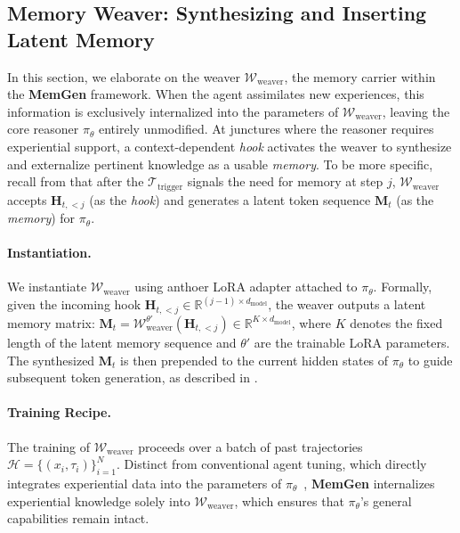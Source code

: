 \documentclass[]{fairmeta}
\newcommand{\ourmethod}{{\fontfamily{lmtt}\selectfont \textbf{MemGen}}\xspace}
\begin{document}
\subsection{Memory Weaver: Synthesizing and Inserting Latent Memory}
\label{sec:weaver}
\vspace{-0.3em}
In this section, we elaborate on the weaver $\mathcal{W}_\text{weaver}$, the memory carrier within the \ourmethod framework. When the agent assimilates new experiences, this information is exclusively internalized into the parameters of $\mathcal{W}_\text{weaver}$, leaving the core reasoner $\pi_\theta$ entirely unmodified. At junctures where the reasoner requires experiential support, a context-dependent \textit{hook} activates the weaver to synthesize and externalize pertinent knowledge as a usable \textit{memory}. To be more specific, recall from  that after the $\mathcal{T}_\text{trigger}$ signals the need for memory at step $j$, $\mathcal{W}_\text{weaver}$ accepts $\mathbf{H}_{t,<j}$ (as the \textit{hook}) and generates a latent token sequence $\mathbf{M}_t$ (as the \textit{memory}) for $\pi_\theta$.

\vspace{-0.8em}
\paragraph{Instantiation.} We instantiate $\mathcal{W}_\text{weaver}$ using anthoer LoRA adapter attached to $\pi_\theta$. Formally, given the incoming hook $\mathbf{H}_{t,<j} \in \mathbb{R}^{(j-1) \times d_\text{model}}$, the weaver outputs a latent memory matrix: $
\mathbf{M}_t = \mathcal{W}_\text{weaver}^{\theta'}(\mathbf{H}_{t,<j}) \in \mathbb{R}^{K \times d_\text{model}}$, where $K$ denotes the fixed length of the latent memory sequence and $\theta'$ are the trainable LoRA parameters. The synthesized $\mathbf{M}_t$ is then prepended to the current hidden states of $\pi_\theta$ to guide subsequent token generation, as described in .


\vspace{-0.8em}
\paragraph{Training Recipe.}  
The training of $\mathcal{W}_\text{weaver}$ proceeds over a batch of past trajectories $\mathcal{H} = \{(x_i, \tau_i)\}_{i=1}^N$. Distinct from conventional agent tuning, which directly integrates experiential data into the parameters of $\pi_\theta$~\citep{chen2025atlasagenttuninglearning,yin2024agentlumosunifiedmodular}, \ourmethod internalizes experiential knowledge solely into $\mathcal{W}_\text{weaver}$, which ensures that $\pi_\theta$'s general capabilities remain intact.
\end{document}
